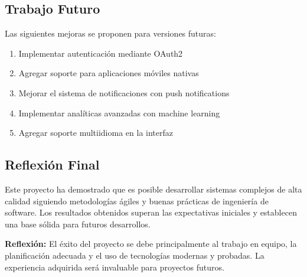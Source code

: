 \documentclass{pt-report}
\begin{document}
\subsection{Trabajo Futuro}

Las siguientes mejoras se proponen para versiones futuras:

\begin{enumerate}
    \item Implementar autenticación mediante OAuth2
    \item Agregar soporte para aplicaciones móviles nativas
    \item Mejorar el sistema de notificaciones con push notifications
    \item Implementar analíticas avanzadas con machine learning
    \item Agregar soporte multiidioma en la interfaz
\end{enumerate}

\subsection{Reflexión Final}

Este proyecto ha demostrado que es posible desarrollar sistemas complejos
de alta calidad siguiendo metodologías ágiles y buenas prácticas de ingeniería
de software. Los resultados obtenidos superan las expectativas iniciales y
establecen una base sólida para futuros desarrollos.

\begin{highlightbox}
    \textbf{Reflexión:} El éxito del proyecto se debe principalmente al trabajo
    en equipo, la planificación adecuada y el uso de tecnologías modernas y
    probadas. La experiencia adquirida será invaluable para proyectos futuros.
\end{highlightbox}
\end{document}
